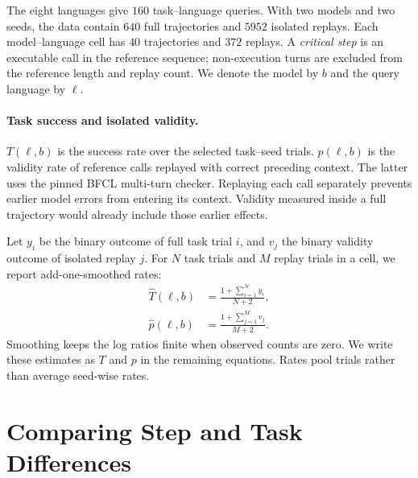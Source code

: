 \documentclass[11pt]{article}
\begin{document}
The eight languages give $160$ task--language queries. With two models and
two seeds, the data contain $640$ full trajectories and $5952$ isolated
replays. Each model--language cell has $40$ trajectories and $372$ replays.
A \emph{critical step} is an executable call in the reference sequence;
non-execution turns are excluded from the reference length and replay count.
We denote the model by $b$ and the query language by $\ell$.

\paragraph{Task success and isolated validity.} $T(\ell,b)$ is the success
rate over the selected task--seed trials. $p(\ell,b)$ is the validity rate
of reference calls replayed with correct preceding context. The latter uses
the pinned BFCL multi-turn checker. Replaying each call separately prevents
earlier model errors from entering its context. Validity measured inside
a full trajectory would already include those earlier effects.

Let $y_i$ be the binary outcome of full task trial $i$, and $v_j$ the binary
validity outcome of isolated replay $j$. For $N$ task trials and $M$ replay
trials in a cell, we report add-one-smoothed rates:
\begin{equation}
\begin{aligned}
\hat T(\ell,b)&=\frac{1+\sum_{i=1}^{N}y_i}{N+2},\\
\hat p(\ell,b)&=\frac{1+\sum_{j=1}^{M}v_j}{M+2}.
\end{aligned}
\label{eq:rates}
\end{equation}
Smoothing keeps the log ratios finite when observed counts are zero.
We write these estimates as $T$ and $p$ in the remaining equations. Rates
pool trials rather than average seed-wise rates.

\section{Comparing Step and Task Differences}
\label{sec:compound}
\end{document}
